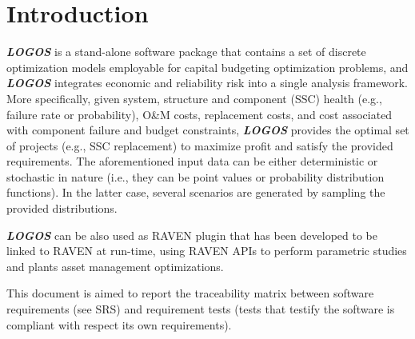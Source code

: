 \section{Introduction}

\textbf{\textit{LOGOS}} is a stand-alone software package that contains a set of discrete
optimization models employable for capital budgeting optimization
problems, and \textbf{\textit{LOGOS}} integrates economic and reliability risk into a single
analysis framework. More specifically,  given system, structure and component
(SSC) health (e.g., failure rate or probability), O\&M costs, replacement costs, and cost
associated with component failure and budget constraints, \textbf{\textit{LOGOS}} provides the optimal set
of projects (e.g., SSC replacement) to maximize profit and satisfy the provided requirements.
The aforementioned input data can be either deterministic or stochastic in nature
(i.e., they can be point values or probability distribution functions). In the latter case,
several scenarios are generated by sampling the provided distributions.

\textbf{\textit{LOGOS}} can be also used as RAVEN plugin that has been developed to be linked
to RAVEN at run-time, using RAVEN APIs to perform parametric studies and plants
asset management optimizations.

This document is aimed to report the traceability matrix between software requirements
(see SRS) and requirement tests (tests that testify the software is compliant
with respect its own requirements).
